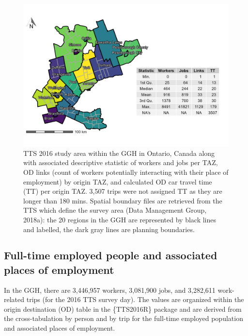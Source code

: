 \documentclass[Royal,times,sageh]{sagej}
\begin{document}
\begin{figure}[H]

{\centering \includegraphics[width=1\linewidth]{images/TTS16-survey-area} 

}

\caption{\label{fig:TTS-16-survey-area}TTS 2016 study area within the GGH in Ontario, Canada along with associated descriptive statistic of workers and jobs per TAZ, OD links (count of workers potentially interacting with their place of employment) by origin TAZ, and calculated OD car travel time (TT) per origin TAZ. 3,507 trips were not assigned TT as they are longer than 180 mins. Spatial boundary files are retrieved from the TTS which define the survey area (Data Management Group, 2018a): the 20 regions in the GGH are represented by black lines and labelled, the dark gray lines are planning boundaries.}\label{fig:TTS-16-survey-area}
\end{figure}

\hypertarget{full-time-employed-people-and-associated-places-of-employment}{%
\subsection{Full-time employed people and associated places of
employment}\label{full-time-employed-people-and-associated-places-of-employment}}

In the GGH, there are 3,446,957 workers, 3,081,900 jobs, and 3,282,611
work-related trips (for the 2016 TTS survey day). The values are
organized within the origin destination (OD) table in the \{TTS2016R\}
package and are derived from the cross-tabulation by person and by trip
for the full-time employed population and associated places of
employment.
\end{document}
